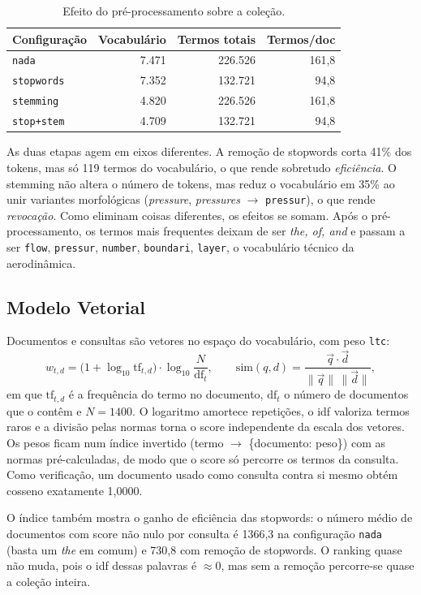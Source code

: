 \documentclass[10pt,a4paper]{article}
\newcommand{\term}[1]{\texttt{#1}}         %
\begin{document}
\begin{table}[h]
\centering\small
\caption{Efeito do pré-processamento sobre a coleção.}
\label{tab:preproc}
\begin{tabular}{lrrr}
\toprule
Configuração & Vocabulário & Termos totais & Termos/doc \\
\midrule
\texttt{nada}       & 7.471 & 226.526 & 161,8 \\
\texttt{stopwords}  & 7.352 & 132.721 &  94,8 \\
\texttt{stemming}   & 4.820 & 226.526 & 161,8 \\
\texttt{stop+stem}  & 4.709 & 132.721 &  94,8 \\
\bottomrule
\end{tabular}
\end{table}

As duas etapas agem em eixos diferentes. A remoção de stopwords corta 41\% dos tokens,
mas só 119 termos do vocabulário, o que rende sobretudo \emph{eficiência}. O stemming não altera o
número de tokens, mas reduz o vocabulário em 35\% ao unir variantes morfológicas
(\emph{pressure}, \emph{pressures} $\to$ \term{pressur}), o que rende \emph{revocação}. Como
eliminam coisas diferentes, os efeitos se somam. Após o pré-processamento, os termos mais
frequentes deixam de ser \emph{the, of, and} e passam a ser \term{flow}, \term{pressur},
\term{number}, \term{boundari}, \term{layer}, o vocabulário técnico da aerodinâmica.

\subsection{Modelo Vetorial}
Documentos e consultas são vetores no espaço do vocabulário, com peso \texttt{ltc}:
\[
  w_{t,d} = \bigl(1 + \log_{10}\mathrm{tf}_{t,d}\bigr)\cdot \log_{10}\frac{N}{\mathrm{df}_t},
  \qquad
  \mathrm{sim}(q,d) = \frac{\vec q\cdot\vec d}{\lVert\vec q\rVert\,\lVert\vec d\rVert},
\]
em que $\mathrm{tf}_{t,d}$ é a frequência do termo no documento, $\mathrm{df}_t$ o número de
documentos que o contêm e $N=1400$. O logaritmo amortece repetições, o idf valoriza termos raros e a
divisão pelas normas torna o score independente da escala dos vetores. Os pesos ficam num índice
invertido (termo $\to$ \{documento: peso\}) com as normas pré-calculadas, de modo que o score só
percorre os termos da consulta. Como verificação, um documento usado como consulta contra si
mesmo obtém cosseno exatamente 1,0000.

O índice também mostra o ganho de eficiência das stopwords: o número médio de documentos com
score não nulo por consulta é 1366,3 na configuração \texttt{nada} (basta um \emph{the} em comum)
e 730,8 com remoção de stopwords. O ranking quase não muda, pois o idf dessas palavras é
$\approx 0$, mas sem a remoção percorre-se quase a coleção inteira.
\end{document}
